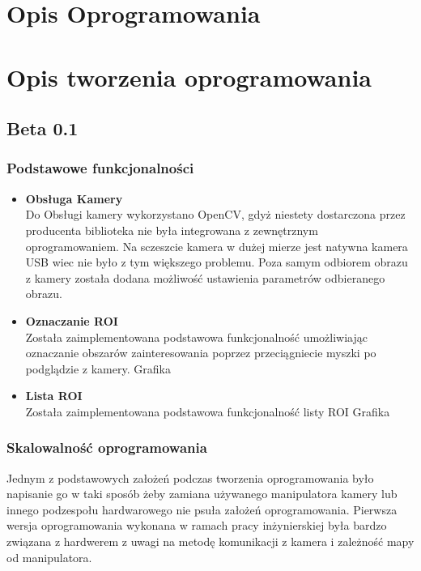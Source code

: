 \documentclass[11pt,a4paper]{article}
\begin{document}
    \section{Opis Oprogramowania}


    \section{Opis tworzenia oprogramowania}

    \subsection{Beta 0.1}

    \subsubsection{Podstawowe funkcjonalności}
    \begin{itemize}
        \item \textbf{Obsługa Kamery} \\ Do Obsługi kamery wykorzystano OpenCV, gdyż niestety dostarczona przez producenta biblioteka nie była integrowana z zewnętrznym oprogramowaniem. Na sczeszcie kamera w dużej mierze jest natywna kamera USB wiec nie było z tym większego problemu. Poza samym odbiorem obrazu z kamery została dodana możliwość ustawienia parametrów odbieranego obrazu.
        \item \textbf{Oznaczanie ROI} \\ Została zaimplementowana podstawowa funkcjonalność umożliwiając oznaczanie obszarów zainteresowania poprzez przeciągniecie myszki po podglądzie z kamery.
            {\color{red}
        Grafika}
        \item \textbf{Lista ROI} \\ Została zaimplementowana podstawowa funkcjonalność listy ROI
            {\color{red}
        Grafika}
    \end{itemize}

    \subsubsection{Skalowalność oprogramowania}

    \hspace{1cm} Jednym z podstawowych założeń podczas tworzenia oprogramowania było napisanie go w taki sposób żeby zamiana używanego manipulatora kamery lub innego podzespołu hardwarowego nie psuła założeń oprogramowania. Pierwsza wersja oprogramowania wykonana w ramach pracy inżynierskiej była bardzo związana z hardwerem z uwagi na metodę komunikacji z kamera i zależność mapy od manipulatora.\\
\end{document}

